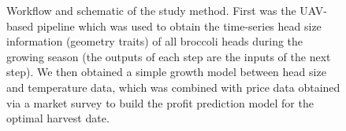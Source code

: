 \begin{figure}[htb]
  \begin{center}
  \end{center}
  \caption[Workflow and schematic of the study method]{
    Workflow and schematic of the study method. First was the UAV-based pipeline which was used to obtain the time-series head size information (geometry traits) of all broccoli heads during the growing season (the outputs of each step are the inputs of the next step). We then obtained a simple growth model between head size and temperature data, which was combined with price data obtained via a market survey to build the profit prediction model for the optimal harvest date.
  }
  \label{fig:cp4.4}
\end{figure}
